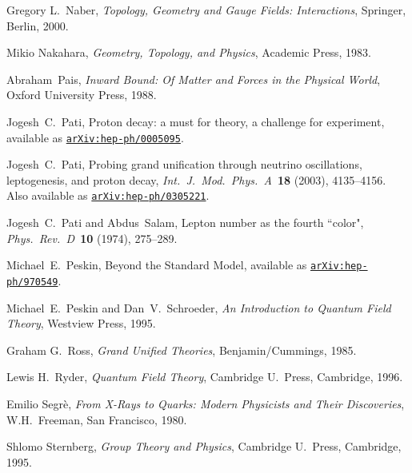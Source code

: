 \documentclass[12pt]{article}
\begin{document}
\begin{thebibliography}{99}
Gregory L.\ Naber, {\em{Topology, Geometry and Gauge Fields: Interactions}}, 
Springer, Berlin, 2000.

Mikio Nakahara, {\em {Geometry, Topology, and Physics}}, Academic Press,
1983.


Abraham\ Pais, {\em {Inward Bound: Of Matter and Forces in the Physical World}},
Oxford University Press, 1988.

Jogesh\ C.\ Pati, Proton decay: a must for theory, a challenge for experiment,
available as
\href{http://arxiv.org/abs/hep-ph/0005095}{\texttt{arXiv:hep-ph/0005095}}. 

Jogesh\ C.\ Pati, Probing grand unification through neutrino oscillations,
leptogenesis, and proton decay, {\em {Int.\ J.\ Mod.\ Phys.\ A\ }}{\bf 18}
(2003), 4135--4156. Also available as
\href{http://arxiv.org/abs/hep-ph/0305221}{\texttt{arXiv:hep-ph/0305221}}.  

Jogesh\ C.\ Pati and Abdus\ Salam, Lepton number as the fourth ``color", {\em
{Phys.\ Rev.\ D\ }}{\bf 10} (1974), 275--289.

Michael\ E.\ Peskin, Beyond the Standard Model, available as 
\href{http://arxiv.org/abs/hep-ph/970549}{\texttt{arXiv:hep-ph/970549}}.

Michael\ E.\ Peskin and Dan\ V.\ Schroeder, {\em {An Introduction to Quantum
Field Theory}}, Westview Press, 1995.

Graham G.\ Ross, {\em {Grand Unified Theories}}, Benjamin/Cummings, 1985.

Lewis H.\ Ryder, {\em {Quantum Field Theory}}, Cambridge U.\ Press, Cambridge,
1996.

Emilio Segr{\`e}, {\em {From X-Rays to Quarks: Modern Physicists and Their
Discoveries}}, W.H.\ Freeman, San Francisco, 1980.

 Shlomo Sternberg, {\em {Group Theory and Physics}},
Cambridge U.\ Press, Cambridge, 1995.


\end{thebibliography}
\end{document}
